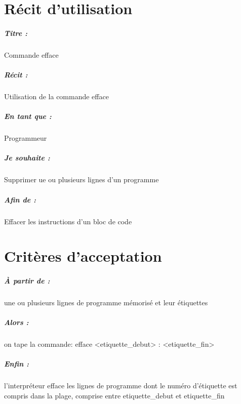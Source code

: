 \documentclass[12pt,a5paper, notitle, oneside]{report}
\begin{document}
    \chapter*{Récit d'utilisation}

    \paragraph{Titre : } Commande efface
    \paragraph{Récit : } Utilisation de la commande efface
    \paragraph{En tant que : } Programmeur
    \paragraph{Je souhaite : } Supprimer ue ou plusieurs lignes d'un programme
    \paragraph{Afin de : } Effacer les instructions d'un bloc de code
    \newpage

    \chapter*{Critères d'acceptation}

    \paragraph{À partir de : } une ou plusieurs lignes de programme mémorisé et leur étiquettes
    \paragraph{Alors : } on tape la commande: efface <etiquette\_debut> : <etiquette\_fin>
    \paragraph{Enfin : } l'interpréteur efface les lignes de programme dont le numéro d'étiquette est compris dans la plage, comprise entre etiquette\_debut et etiquette\_fin
\end{document}
